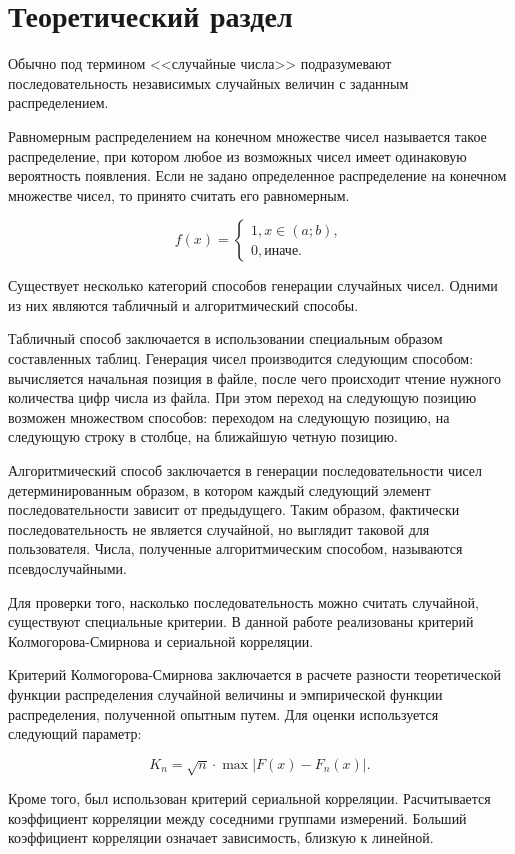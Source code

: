 \chapter{Теоретический раздел}

Обычно под термином <<случайные числа>> подразумевают последовательность независимых случайных величин с заданным распределением.

Равномерным распределением на конечном множестве чисел называется такое распределение, при котором любое из возможных чисел имеет одинаковую вероятность появления. Если не задано определенное распределение на конечном множестве чисел, то принято считать его равномерным.

\begin{equation}
	f(x) = \begin{cases}
        1, x \in (a; b), \\
        0, \text{иначе}.
    \end{cases}
\end{equation}

Существует несколько категорий способов генерации случайных чисел. Одними из них являются табличный и алгоритмический способы.

Табличный способ заключается в использовании специальным образом составленных таблиц. Генерация чисел производится следующим способом: вычисляется начальная позиция в файле, после чего происходит чтение нужного количества цифр числа из файла. При этом переход на следующую позицию возможен множеством способов: переходом на следующую позицию, на следующую строку в столбце, на ближайшую четную позицию.

Алгоритмический способ заключается в генерации последовательности чисел детерминированным образом, в котором каждый следующий элемент последовательности зависит от предыдущего. Таким образом, фактически последовательность не является случайной, но выглядит таковой для пользователя. Числа, полученные алгоритмическим способом, называются псевдослучайными.

Для проверки того, насколько последовательность можно считать случайной, существуют специальные критерии. В данной работе реализованы критерий Колмогорова-Смирнова и сериальной корреляции.

Критерий Колмогорова-Смирнова заключается в расчете разности теоретической функции распределения случайной величины и эмпирической функции распределения, полученной опытным путем. Для оценки используется следующий параметр:

\begin{equation}
	K_n = \sqrt{n} \cdot \max{|F(x) - F_n(x)|}.
\end{equation}

Кроме того, был использован критерий сериальной корреляции. Расчитывается коэффициент корреляции между соседними группами измерений. Больший коэффициент корреляции означает зависимость, близкую к линейной.